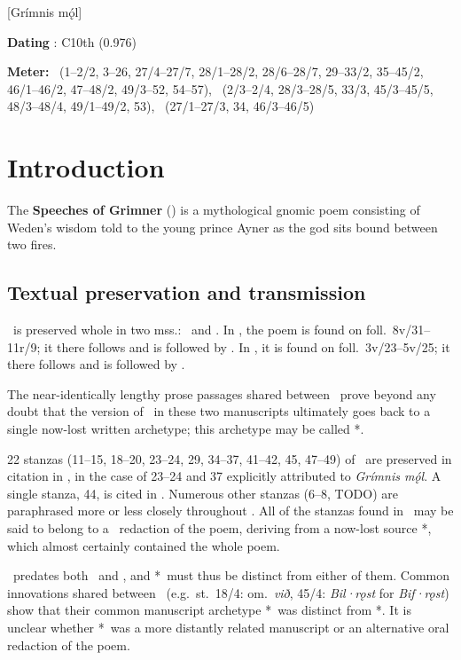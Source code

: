 [Grímnis mǫ́l]

\begin{flushright}%
\textbf{Dating} \parencite{Sapp2022}: C10th (0.976)

\textbf{Meter:} \Ljodahattr\ (1--2/2, 3--26, 27/4--27/7, 28/1--28/2, 28/6--28/7, 29--33/2, 35--45/2, 46/1--46/2, 47--48/2, 49/3--52, 54--57), \Fornyrdislag\ (2/3--2/4, 28/3--28/5, 33/3, 45/3--45/5, 48/3--48/4, 49/1--49/2, 53), \Galdralag\ (27/1--27/3, 34, 46/3--46/5)%
\end{flushright}

\section{Introduction}

The \textbf{Speeches of Grimner} () is a mythological gnomic poem consisting of Weden’s wisdom told to the young prince Ayner as the god sits bound between two fires.

\subsection{Textual preservation and transmission}

\Grimnismal\ is preserved whole in two mss.: \Regius\ and \AM.  In \Regius, the poem is found on foll.~8v/31--11r/9; it there follows  and is followed by .  In \AM, it is found on foll.~3v/23--5v/25; it there follows  and is followed by .

The near-identically lengthy prose passages shared between \Regius\AM\ prove beyond any doubt that the version of \Grimnismal\ in these two manuscripts ultimately goes back to a single now-lost written archetype; this archetype may be called *\Regius\AM.

22 stanzas (11--15, 18--20, 23--24, 29, 34--37, 41--42, 45, 47--49) of \Grimnismal\ are preserved in citation in \Gylfaginning, in the case of 23--24 and 37 explicitly attributed to \emph{Grímnis mǫ́l}.  A single stanza, 44, is cited in \Skaldskaparmal.  Numerous other stanzas (6--8, TODO) are paraphrased more or less closely throughout \Gylfaginning.  All of the stanzas found in \Gylfaginning\ may be said to belong to a \GylfMS\ redaction of the poem, deriving from a now-lost source *\GylfMS, which almost certainly contained the whole poem.

\Gylfaginning\ predates both \Regius\ and \AM, and *\GylfMS\ must thus be distinct from either of them.  Common innovations shared between \Regius\AM\ (e.g.~st.~18/4: om.~\emph{við}, 45/4: \emph{Bil·rǫst} for \emph{Bif·rǫst}) show that their common manuscript archetype *\Regius\AM\ was distinct from *\GylfMS.  It is unclear whether *\GylfMS\ was a more distantly related manuscript or an alternative oral redaction of the poem.

